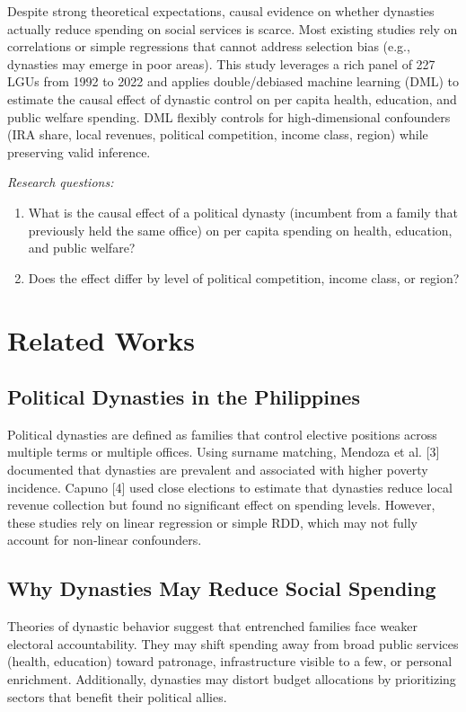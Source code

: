 \documentclass[conference]{IEEEtran}
\begin{document}
Despite strong theoretical expectations, causal evidence on whether dynasties actually reduce spending on social services is scarce. Most existing studies rely on correlations or simple regressions that cannot address selection bias (e.g., dynasties may emerge in poor areas). This study leverages a rich panel of 227 LGUs from 1992 to 2022 and applies double/debiased machine learning (DML) to estimate the causal effect of dynastic control on per capita health, education, and public welfare spending. DML flexibly controls for high‑dimensional confounders (IRA share, local revenues, political competition, income class, region) while preserving valid inference.

\textit{Research questions:}
\begin{enumerate}
    \item What is the causal effect of a political dynasty (incumbent from a family that previously held the same office) on per capita spending on health, education, and public welfare?
    \item Does the effect differ by level of political competition, income class, or region?
\end{enumerate}

\section{Related Works}

\subsection{Political Dynasties in the Philippines}
Political dynasties are defined as families that control elective positions across multiple terms or multiple offices. Using surname matching, Mendoza et al. [3] documented that dynasties are prevalent and associated with higher poverty incidence. Capuno [4] used close elections to estimate that dynasties reduce local revenue collection but found no significant effect on spending levels. However, these studies rely on linear regression or simple RDD, which may not fully account for non‑linear confounders.

\subsection{Why Dynasties May Reduce Social Spending}
Theories of dynastic behavior suggest that entrenched families face weaker electoral accountability. They may shift spending away from broad public services (health, education) toward patronage, infrastructure visible to a few, or personal enrichment. Additionally, dynasties may distort budget allocations by prioritizing sectors that benefit their political allies.
\end{document}

